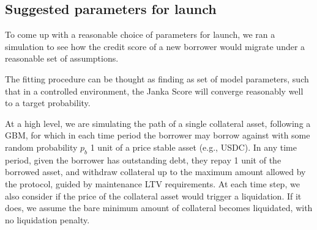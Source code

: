 \documentclass{article}
\begin{document}
\subsection{Suggested parameters for launch}

To come up with a reasonable choice of parameters for launch, we ran a simulation to see how the credit score of a new borrower would migrate under a reasonable set of assumptions.

The fitting procedure can be thought as finding as set of model parameters, such that in a controlled environment, the Janka Score will converge reasonably well to a target probability. 

At a high level, we are simulating the path of a single collateral asset, following a GBM, for which in each time period the borrower may borrow against with some random probability $p_b$ 1 unit of a price stable asset (e.g., USDC). In any time period, given the borrower has outstanding debt, they repay 1 unit of the borrowed asset, and withdraw collateral up to the maximum amount allowed by the protocol, guided by maintenance LTV requirements. At each time step, we also consider if the price of the collateral asset would trigger a liquidation. If it does, we assume the bare minimum amount of collateral becomes liquidated, with no liquidation penalty.
\end{document}
